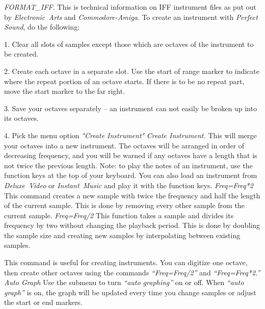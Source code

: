 {\sl FORMAT\_IFF\/}. This is technical information on IFF instrument
files as put out by {\sl Electronic~Arts\/} and {\sl Commodore-Amiga\/}.
\smallskip
To create an instrument with
{\sl Perfect Sound},
do the following:
\smallskip
\item{1.} Clear all slots of samples except those which are octaves of
the instrument to be created.
\smallskip
\item{2.} Create each octave in a separate slot. Use the start of range
marker to indicate where the repeat portion of an octave starts.
If there is to be no repeat part, move the start marker to the
far right.
\smallskip
\item{3.} Save your octaves separately -- an instrument can not
easily be broken up into its octaves.
\smallskip
\item{4.} Pick the menu option {\sl "Create Instrument"}
\bigskip
{\sl Create Instrument.}
\smallskip
This will merge your octaves into a new instrument. The octaves
will be arranged in order of decreasing frequency, and you
will be warned if any octaves have a length that is not
twice the previous length.
\smallskip
Note: to play the notes of an instrument, use the function
keys at the top of your keyboard. You can also load an
instrument from
{\sl Deluxe~Video\/}
or
{\sl Instant~Music\/}
and play it with the function keys.
\bigskip
{\sl Freq=Freq*2}
\smallskip
This command creates a new sample with twice the frequency
and half the length of
the current sample. This is done by removing every
other sample from the current sample.
\bigskip
{\sl Freq=Freq/2}
\smallskip
This function takes a sample and divides its frequency by two
without changing the playback period.  This is done by doubling
the sample size and creating new samples by interpolating between
existing samples.

This command is useful for creating instruments. You can digitize
one octave, then create other octaves using the commands
{\sl ``Freq=Freq/2''\/} and {\sl ``Freq=Freq*2.''\/}
\bigskip
{\sl Auto Graph}
\smallskip
Use the submenu to turn {\sl ``auto graphing''} on or off. When
{\sl ``auto graph''} is on, the graph will be updated every time
you change samples or adjust the start or end markers.
\vfill\eject

